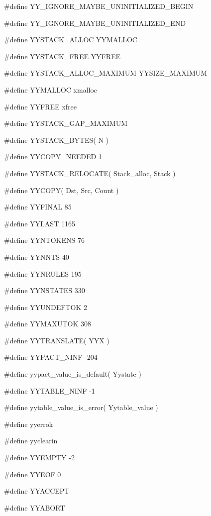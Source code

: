 \medskip
{\stt \#define YY\_IGNORE\_MAYBE\_UNINITIALIZED\_BEGIN}

\medskip
{\stt \#define YY\_IGNORE\_MAYBE\_UNINITIALIZED\_END}

\medskip
{\stt \#define YYSTACK\_ALLOC YYMALLOC}

\medskip
{\stt \#define YYSTACK\_FREE YYFREE}

\medskip
{\stt \#define YYSTACK\_ALLOC\_MAXIMUM YYSIZE\_MAXIMUM}

\medskip
{\stt \#define YYMALLOC xmalloc}

\medskip
{\stt \#define YYFREE xfree}

\medskip
{\stt \#define YYSTACK\_GAP\_MAXIMUM}

\medskip
{\stt \#define YYSTACK\_BYTES( N )}

\medskip
{\stt \#define YYCOPY\_NEEDED 1}

\medskip
{\stt \#define YYSTACK\_RELOCATE( Stack\_alloc, Stack )}

\medskip
{\stt \#define YYCOPY( Dst, Src, Count )}

\medskip
{\stt \#define YYFINAL 85}

\medskip
{\stt \#define YYLAST 1165}

\medskip
{\stt \#define YYNTOKENS 76}

\medskip
{\stt \#define YYNNTS 40}

\medskip
{\stt \#define YYNRULES 195}

\medskip
{\stt \#define YYNSTATES 330}

\medskip
{\stt \#define YYUNDEFTOK 2}

\medskip
{\stt \#define YYMAXUTOK 308}

\medskip
{\stt \#define YYTRANSLATE( YYX )}

\medskip
{\stt \#define YYPACT\_NINF -204}

\medskip
{\stt \#define yypact\_value\_is\_default( Yystate )}

\medskip
{\stt \#define YYTABLE\_NINF -1}

\medskip
{\stt \#define yytable\_value\_is\_error( Yytable\_value )}

\medskip
{\stt \#define yyerrok}

\medskip
{\stt \#define yyclearin}

\medskip
{\stt \#define YYEMPTY -2}

\medskip
{\stt \#define YYEOF 0}

\medskip
{\stt \#define YYACCEPT}

\medskip
{\stt \#define YYABORT}


